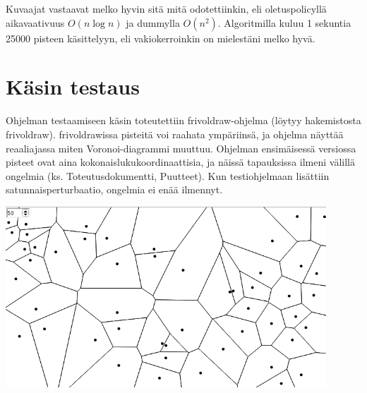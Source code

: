 \documentclass[a4paper, 11pt, finnish]{article}
\begin{document}
Kuvaajat vastaavat melko hyvin sitä mitä odotettiinkin, eli oletuspolicyllä aikavaativuus $O(n\log n)$ ja dummylla $O(n^2)$. Algoritmilla kuluu 1 sekuntia 25000 pisteen käsittelyyn, eli vakiokerroinkin on mielestäni melko hyvä. 

\section*{Käsin testaus}
Ohjelman testaamiseen käsin toteutettiin frivoldraw-ohjelma (löytyy hakemistosta frivoldraw). frivoldrawissa pisteitä voi raahata ympäriinsä, ja ohjelma näyttää reaaliajassa miten Voronoi-diagrammi muuttuu. Ohjelman ensimäisessä versiossa pisteet ovat aina kokonaislukukoordinaattisia, ja näissä tapauksissa ilmeni välillä ongelmia (ks. Toteutusdokumentti, Puutteet).   Kun testiohjelmaan lisättiin satunnaisperturbaatio, ongelmia ei enää ilmennyt.

\includegraphics[width=12cm]{frivoldraw.png}
\end{document}
